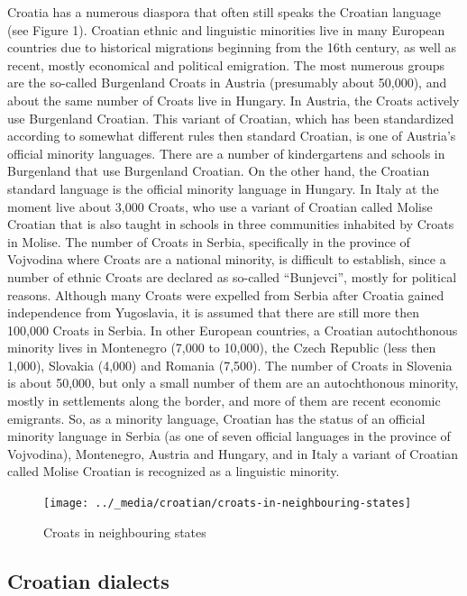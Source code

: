 \begin{multicols}{2}
Croatia has a numerous diaspora that often still speaks the Croatian language (see Figure 1). Croatian ethnic and linguistic minorities live in many European countries due to historical migrations beginning from the 16th century, as well as recent, mostly economical and political emigration. The most numerous groups are the so-called Burgenland Croats in Austria (presumably about 50,000), and about the same number of Croats live in Hungary. In Austria, the Croats actively use Burgenland Croatian. This variant of Croatian, which has been standardized according to somewhat different rules then standard Croatian, is one of Austria’s official minority languages. There are a number of kindergartens and schools in Burgenland that use Burgenland Croatian. On the other hand, the Croatian standard language is the official minority language in Hungary. In Italy at the moment live about 3,000 Croats, who use a variant of Croatian called Molise Croatian that is also taught in schools in three communities inhabited by Croats in Molise. The number of Croats in Serbia, specifically in the province of Vojvodina where Croats are a national minority, is difficult to establish, since a number of ethnic Croats are declared as so-called “Bunjevci”, mostly for political reasons. Although many Croats were expelled from Serbia after Croatia gained independence from Yugoslavia, it is assumed that there are still more then 100,000 Croats in Serbia. In other European countries, a Croatian autochthonous minority lives in Montenegro (7,000 to 10,000), the Czech Republic (less then 1,000), Slovakia (4,000) and Romania (7,500). The number of Croats in Slovenia is about 50,000, but only a small number of them are an autochthonous minority, mostly in settlements along the border, and more of them are recent economic emigrants. So, as a minority language, Croatian has the status of an official minority language in Serbia (as one of seven official languages in the province of Vojvodina), Montenegro, Austria and Hungary, and in Italy a variant of Croatian called Molise Croatian is recognized as a linguistic minority.

\begin{figure}[htb]
  \center
  \texttt{[image: ../\_media/croatian/croats-in-neighbouring-states]}
  \caption{Croats in neighbouring states \cite{boo2}}
  \label{fig:hrvati_en}
\end{figure}

\subsection{Croatian dialects}


\end{multicols}
